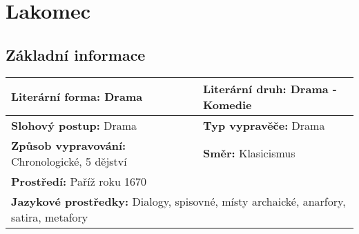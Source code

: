 \section{Lakomec}
\subsection*{Základní informace}
\begin{tabularx}{\linewidth}{l|l}
    \textbf{Literární forma:} Drama                       & \textbf{Literární druh:} Drama - Komedie                 \\
    \hline
    \textbf{Slohový postup:} Drama                        & \textbf{Typ vypravěče:} Drama                            \\
    \hline
    \textbf{Způsob vypravování:} Chronologické, 5 dějství & \textbf{Směr:} Klasicismus                               \\
    \hline
    \multicolumn{2}{l}{\textbf{Prostředí:} Paříž roku 1670}                                                          \\
    \hline
    \multicolumn{2}{l}{\textbf{Jazykové prostředky:} Dialogy, spisovné, místy archaické, anarfory, satira, metafory} \\
\end{tabularx}

